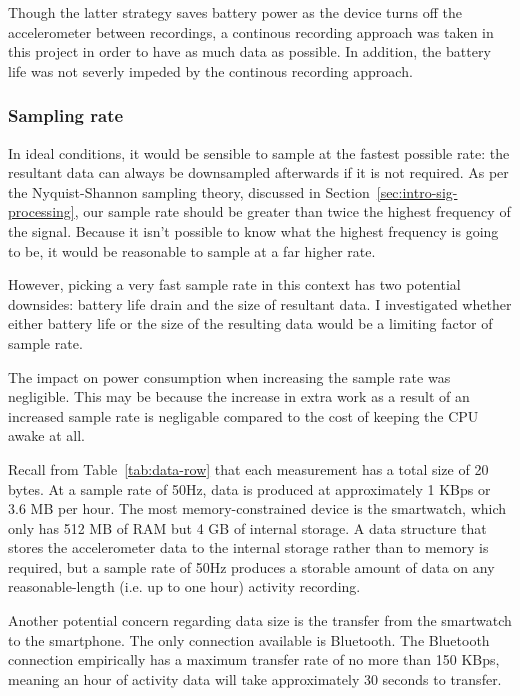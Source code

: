         Though the latter strategy saves battery power as the device turns off the accelerometer between recordings, a continous recording approach was taken in this project in order to have as much data as possible. In addition, the battery life was not severly impeded by the continous recording approach.
        
      \subsubsection{Sampling rate}
        In ideal conditions, it would be sensible to sample at the fastest possible rate: the resultant data can always be downsampled afterwards if it is not required. As per the Nyquist-Shannon sampling theory, discussed in Section~\ref{sec:intro-sig-processing}, our sample rate should be greater than twice the highest frequency of the signal. Because it isn't possible to know what the highest frequency is going to be, it would be reasonable to sample at a far higher rate. 
        
        However, picking a very fast sample rate in this context has two potential downsides: battery life drain and the size of resultant data. I investigated whether either battery life or the size of the resulting data would be a limiting factor of sample rate.
        
        The impact on power consumption when increasing the sample rate was negligible. This may be because the increase in extra work as a result of an increased sample rate is negligable compared to the cost of keeping the CPU awake at all.
      
        Recall from Table~\ref{tab:data-row} that each measurement has a total size of 20 bytes. At a sample rate of 50\si{Hz}, data is produced at approximately 1 KBps or 3.6 MB per hour. The most memory-constrained device is the smartwatch, which only has 512 MB of RAM but 4 GB of internal storage. A data structure that stores the accelerometer data to the internal storage rather than to memory is required, but a sample rate of 50\si{Hz} produces a storable amount of data on any reasonable-length (i.e. up to one hour) activity recording.
        
        Another potential concern regarding data size is the transfer from the smartwatch to the smartphone. The only connection available is Bluetooth. The Bluetooth connection empirically has a maximum transfer rate of no more than 150 KBps, meaning an hour of activity data will take approximately 30 seconds to transfer.

